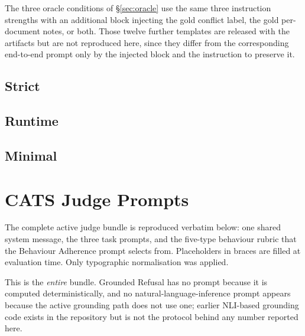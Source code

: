 The three oracle conditions of \S\ref{sec:oracle} use the same three instruction
strengths with an additional block injecting the gold conflict label, the gold
per-document notes, or both. Those twelve further templates are released with the
artifacts but are not reproduced here, since they differ from the corresponding
end-to-end prompt only by the injected block and the instruction to preserve it.

\onecolumn

\subsection{Strict}

\subsection{Runtime}

\subsection{Minimal}

\FloatBarrier

\section{CATS Judge Prompts}
\label{app:catsprompts}

The complete active judge bundle is reproduced verbatim below: one shared system
message, the three task prompts, and the five-type behaviour rubric that the
Behaviour Adherence prompt selects from. Placeholders in braces are filled at
evaluation time. Only typographic normalisation was applied.

This is the \emph{entire} bundle. Grounded Refusal has no prompt because it is
computed deterministically, and no natural-language-inference prompt appears
because the active grounding path does not use one; earlier NLI-based grounding
code exists in the repository but is not the protocol behind any number reported
here.

